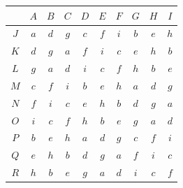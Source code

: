 \documentclass[11pt,a4paper]{article}
\begin{document}
\begin{center}
\begin{tabular}{c|ccccccccc}
 & $A$ & $B$ & $C$ & $D$ & $E$ & $F$ & $G$ & $H$ & $I$ \\
\hline
$J$ & $a$ & $d$ & $g$ & $c$ & $f$ & $i$ & $b$ & $e$ & $h$ \\
$K$ & $d$ & $g$ & $a$ & $f$ & $i$ & $c$ & $e$ & $h$ & $b$ \\
$L$ & $g$ & $a$ & $d$ & $i$ & $c$ & $f$ & $h$ & $b$ & $e$ \\
$M$ & $c$ & $f$ & $i$ & $b$ & $e$ & $h$ & $a$ & $d$ & $g$ \\
$N$ & $f$ & $i$ & $c$ & $e$ & $h$ & $b$ & $d$ & $g$ & $a$ \\
$O$ & $i$ & $c$ & $f$ & $h$ & $b$ & $e$ & $g$ & $a$ & $d$ \\
$P$ & $b$ & $e$ & $h$ & $a$ & $d$ & $g$ & $c$ & $f$ & $i$ \\
$Q$ & $e$ & $h$ & $b$ & $d$ & $g$ & $a$ & $f$ & $i$ & $c$ \\
$R$ & $h$ & $b$ & $e$ & $g$ & $a$ & $d$ & $i$ & $c$ & $f$
\end{tabular}
\end{center}
\end{document}
